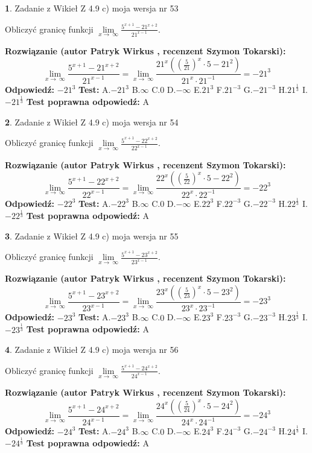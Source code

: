 \documentclass[12pt, a4paper]{article}
\theoremstyle{definition} %
\newtheorem{zad}{}
\newcommand{\zadStart}[1]{\begin{zad}#1\newline}
\newcommand{\zadStop}{\end{zad}}
\newcommand{\rozwStart}[2]{\noindent \textbf{Rozwiązanie (autor #1 , recenzent #2): }\newline}
\newcommand{\rozwStop}{\newline}
\newcommand{\odpStart}{\noindent \textbf{Odpowiedź:}\newline}
\newcommand{\odpStop}{\newline}
\newcommand{\testStart}{\noindent \textbf{Test:}\newline}
\newcommand{\testStop}{\newline}
\newcommand{\kluczStart}{\noindent \textbf{Test poprawna odpowiedź:}\newline}
\newcommand{\kluczStop}{\newline}
\begin{document}
\zadStart{Zadanie z Wikieł Z 4.9 c) moja wersja nr 53}


Obliczyć granicę funkcji  $\lim\limits_{x\to\ \infty}\frac{5^{x+1}-21^{x+2}}{21^{x-1}}$.
\zadStop
\rozwStart{Patryk Wirkus}{Szymon Tokarski}
$$\lim\limits_{x\to\ \infty}\frac{5^{x+1}-21^{x+2}}{21^{x-1}}=\lim\limits_{x\to\ \infty}\frac{21^{x}((\frac{5}{21})^{x}\cdot 5 -21^{2})}{21^{x}\cdot 21^{-1}} = -21^{3}$$
\rozwStop
\odpStart
$-21^{3}$
\odpStop
\testStart
A.$-21^{3}$ B.$\infty$ C.$0$ D.$-\infty$ E.$21^{3}$
F.$21^{-3}$ G.$-21^{-3}$
H.$21^{\frac{1}{3}}$
I.$-21^{\frac{1}{3}}$
\testStop
\kluczStart
A
\kluczStop



\zadStart{Zadanie z Wikieł Z 4.9 c) moja wersja nr 54}


Obliczyć granicę funkcji  $\lim\limits_{x\to\ \infty}\frac{5^{x+1}-22^{x+2}}{22^{x-1}}$.
\zadStop
\rozwStart{Patryk Wirkus}{Szymon Tokarski}
$$\lim\limits_{x\to\ \infty}\frac{5^{x+1}-22^{x+2}}{22^{x-1}}=\lim\limits_{x\to\ \infty}\frac{22^{x}((\frac{5}{22})^{x}\cdot 5 -22^{2})}{22^{x}\cdot 22^{-1}} = -22^{3}$$
\rozwStop
\odpStart
$-22^{3}$
\odpStop
\testStart
A.$-22^{3}$ B.$\infty$ C.$0$ D.$-\infty$ E.$22^{3}$
F.$22^{-3}$ G.$-22^{-3}$
H.$22^{\frac{1}{3}}$
I.$-22^{\frac{1}{3}}$
\testStop
\kluczStart
A
\kluczStop



\zadStart{Zadanie z Wikieł Z 4.9 c) moja wersja nr 55}


Obliczyć granicę funkcji  $\lim\limits_{x\to\ \infty}\frac{5^{x+1}-23^{x+2}}{23^{x-1}}$.
\zadStop
\rozwStart{Patryk Wirkus}{Szymon Tokarski}
$$\lim\limits_{x\to\ \infty}\frac{5^{x+1}-23^{x+2}}{23^{x-1}}=\lim\limits_{x\to\ \infty}\frac{23^{x}((\frac{5}{23})^{x}\cdot 5 -23^{2})}{23^{x}\cdot 23^{-1}} = -23^{3}$$
\rozwStop
\odpStart
$-23^{3}$
\odpStop
\testStart
A.$-23^{3}$ B.$\infty$ C.$0$ D.$-\infty$ E.$23^{3}$
F.$23^{-3}$ G.$-23^{-3}$
H.$23^{\frac{1}{3}}$
I.$-23^{\frac{1}{3}}$
\testStop
\kluczStart
A
\kluczStop



\zadStart{Zadanie z Wikieł Z 4.9 c) moja wersja nr 56}


Obliczyć granicę funkcji  $\lim\limits_{x\to\ \infty}\frac{5^{x+1}-24^{x+2}}{24^{x-1}}$.
\zadStop
\rozwStart{Patryk Wirkus}{Szymon Tokarski}
$$\lim\limits_{x\to\ \infty}\frac{5^{x+1}-24^{x+2}}{24^{x-1}}=\lim\limits_{x\to\ \infty}\frac{24^{x}((\frac{5}{24})^{x}\cdot 5 -24^{2})}{24^{x}\cdot 24^{-1}} = -24^{3}$$
\rozwStop
\odpStart
$-24^{3}$
\odpStop
\testStart
A.$-24^{3}$ B.$\infty$ C.$0$ D.$-\infty$ E.$24^{3}$
F.$24^{-3}$ G.$-24^{-3}$
H.$24^{\frac{1}{3}}$
I.$-24^{\frac{1}{3}}$
\testStop
\kluczStart
A
\kluczStop
\end{document}
